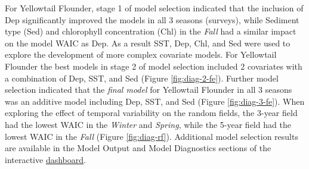 \documentclass[
]{article}
\begin{document}
For Yellowtail Flounder, stage 1 of model selection indicated that the inclusion of Dep significantly improved the models in all 3 seasons (surveys), while Sediment type (Sed) and chlorophyll concentration (Chl) in the \emph{Fall} had a similar impact on the model WAIC as Dep. As a result SST, Dep, Chl, and Sed were used to explore the development of more complex covariate models. For Yellowtail Flounder the best models in stage 2 of model selection included 2 covariates with a combination of Dep, SST, and Sed (Figure \ref{fig:diag-2-fe}). Further model selection indicated that the \emph{final model} for Yellowtail Flounder in all 3 seasons was an additive model including Dep, SST, and Sed (Figure \ref{fig:diag-3-fe}). When exploring the effect of temporal variability on the random fields, the 3-year field had the lowest WAIC in the \emph{Winter} and \emph{Spring}, while the 5-year field had the lowest WAIC in the \emph{Fall} (Figure \ref{fig:diag-rf}). Additional model selection results are available in the Model Output and Model Diagnostics sections of the interactive \href{https://github.com/Dave-Keith/Paper_2_SDMs/tree/master/Dashboard}{dashboard}.
\end{document}
